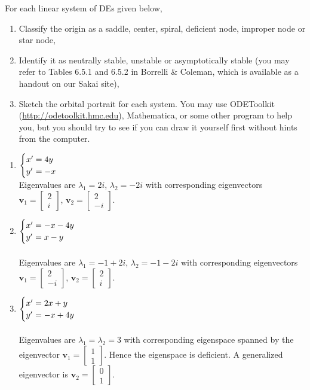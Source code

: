 \documentclass[12pt,letterpaper]{hmcpset}
\newcommand{\m}[1]{\begin{bmatrix} #1 \end{bmatrix}}
\begin{document}

\begin{problem}[1]
    For each linear system of DEs given below,
    \begin{enumerate}[label=(\roman*)]
        \item Classify the origin as a saddle, center, spiral,
            deficient node, improper node or star node,
        \item Identify it as neutrally stable, unstable or
            asymptotically stable (you may refer to Tables 6.5.1 and
            6.5.2 in Borrelli \& Coleman, which is available as a
            handout on our Sakai site),
        \item Sketch the orbital portrait for each system. You may use
            ODEToolkit (\url{http://odetoolkit.hmc.edu}), Mathematica, or some
            other program to help you, but you should try to see if you can draw
            it yourself first without hints from the computer.
    \end{enumerate}
    \begin{enumerate}
        \item $\begin{cases}
            x'&\hspace{-.1in}=4y\\
            y'&\hspace{-.1in}=-x\end{cases}$\\ 
            Eigenvalues are $\lambda_1=2i$, $\lambda_2=-2i$ with
            corresponding eigenvectors $\mathbf{v}_1=\m{2\\i}$,
            $\mathbf{v}_2=\m{2\\-i}$.
        \item $\begin{cases}
            x'&\hspace{-.1in}=-x-4y\\
            y'&\hspace{-.1in}=x-y\end{cases}$\\\\
            Eigenvalues are $\lambda_1=-1+2i$, $\lambda_2=-1-2i$ with
            corresponding eigenvectors $\mathbf{v}_1=\m{2\\-i}$,
            $\mathbf{v}_2=\m{2\\i}$.
        \item $\begin{cases}
            x'&\hspace{-.1in}=2x+y\\
            y'&\hspace{-.1in}=-x+4y\end{cases}$\\\\ 
            Eigenvalues are $\lambda_1=\lambda_2=3$ with corresponding
            eigenspace spanned by the eigenvector
            $\mathbf{v}_1=\m{1\\1}$. Hence the eigenspace is
            deficient. A generalized eigenvector is
            $\mathbf{v}_2=\m{0\\1}$.
    \end{enumerate}
\end{problem}
\end{document}

